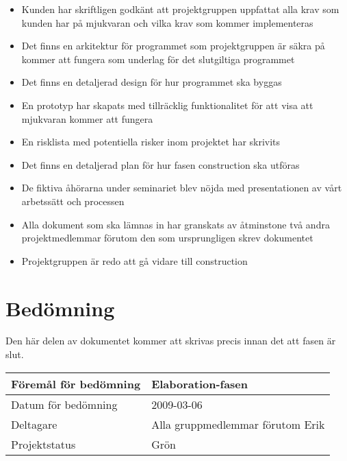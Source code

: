 \begin{itemize}
	\item Kunden har skriftligen godkänt att projektgruppen uppfattat alla krav som kunden har på mjukvaran och vilka krav som kommer implementeras 
	\item Det finns en arkitektur för programmet som projektgruppen är säkra på kommer att fungera som underlag för det slutgiltiga programmet
	\item Det finns en detaljerad design för hur programmet ska byggas
	\item En prototyp har skapats med tillräcklig funktionalitet för att visa att mjukvaran kommer att fungera
	\item En risklista med potentiella risker inom projektet har skrivits
	\item Det finns en detaljerad plan för hur fasen construction ska utföras
	\item De fiktiva åhörarna under seminariet blev nöjda med presentationen av vårt arbetssätt och processen
	\item Alla dokument som ska lämnas in har granskats av åtminstone två andra projektmedlemmar förutom den som ursprungligen skrev dokumentet
	\item Projektgruppen är redo att gå vidare till construction
\end{itemize}

\section{Bedömning}
Den här delen av dokumentet kommer att skrivas precis innan det att fasen är slut.

\begin{center}
	\begin{tabular}{| l | l |}
		\hline Föremål för bedömning & Elaboration-fasen \\
		\hline Datum för bedömning & 2009-03-06 \\
		\hline Deltagare & Alla gruppmedlemmar förutom Erik \\
		\hline Projektstatus & Grön \\
		\hline
	\end{tabular}
\end{center}


